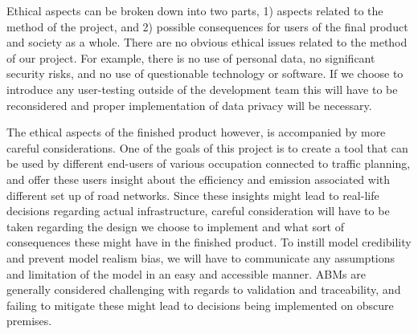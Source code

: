
Ethical aspects can be broken down into two parts, 1) aspects related to the method of the project, and 2) possible consequences for users of the final product and society as a whole. There are no obvious ethical issues related to the method of our project. For example, there is no use of personal data, no significant security risks, and no use of questionable technology or software. If we choose to introduce any user-testing outside of the development team this will have to be reconsidered and proper implementation of data privacy will be necessary. 

The ethical aspects of the finished product however, is accompanied by more careful considerations. One of the goals of this project is to create a tool that can be used by different end-users of various occupation connected to traffic planning, and offer these users insight about the efficiency and emission associated with different set up of road networks. Since these insights might lead to real-life decisions regarding actual infrastructure, careful consideration will have to be taken regarding the design we choose to implement and what sort of consequences these might have in the finished product. To instill model credibility and prevent model realism bias, we will have to communicate any assumptions and limitation of the model in an easy and accessible manner. ABMs are generally considered challenging with regards to validation and traceability\cite{abm-validation-issues}, and failing to mitigate these might lead to decisions being implemented on obscure premises. 
